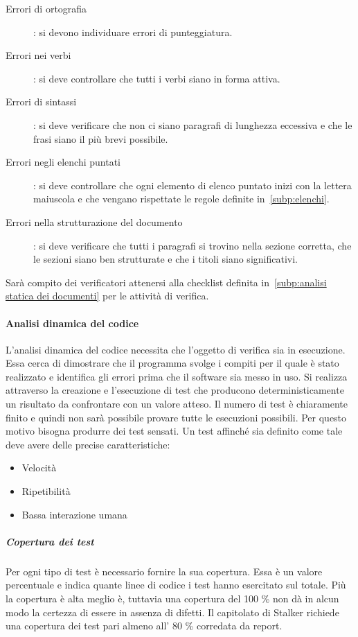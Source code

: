 \documentclass[../norme-di-progetto.tex]{subfiles}
\begin{document}
\begin{description}
    \item [Errori di ortografia]: si devono individuare errori di punteggiatura.
    \item [Errori nei verbi]: si deve controllare che tutti i verbi siano in forma attiva.
    \item [Errori di sintassi]: si deve verificare che non ci siano paragrafi di lunghezza eccessiva e che le frasi siano il più brevi possibile.
    \item [Errori negli elenchi puntati]: si deve controllare che ogni elemento di elenco puntato inizi con la lettera maiuscola e che vengano rispettate le regole definite in~\ref{subp:elenchi}.
    \item [Errori nella strutturazione del documento]: si deve verificare che tutti i paragrafi si trovino nella sezione corretta, che le sezioni siano ben strutturate e che i titoli siano significativi.
\end{description}

Sarà compito dei verificatori attenersi alla checklist definita in~\ref{subp:analisi statica dei documenti} per le attività di verifica.

\paragraph{Analisi dinamica del codice}%
\label{par:analisi dinamica del codice}
L'analisi dinamica del codice necessita che l'oggetto di verifica sia in esecuzione.
Essa cerca di dimostrare che il programma svolge i compiti per il quale è stato realizzato e identifica gli errori prima che il software sia messo in uso.
Si realizza attraverso la creazione e l'esecuzione di test che producono deterministicamente un risultato da confrontare con un valore atteso.
Il numero di test è chiaramente finito e quindi non sarà possibile provare tutte le esecuzioni possibili.
Per questo motivo bisogna produrre dei test sensati.
Un test affinché sia definito come tale deve avere delle precise caratteristiche:

\begin{itemize}
  \item Velocità
  \item Ripetibilità
  \item Bassa interazione umana
\end{itemize}

\subparagraph{Copertura dei test}%
\label{subp:copertura dei test}
Per ogni tipo di test è necessario fornire la sua copertura.
Essa è un valore percentuale e indica quante linee di codice i test hanno esercitato sul totale.
Più la copertura è alta meglio è, tuttavia una copertura del 100 \% non dà in alcun modo la certezza di essere in assenza di difetti.
Il capitolato di Stalker richiede una copertura dei test pari almeno all' 80 \% corredata da report.
\end{document}

